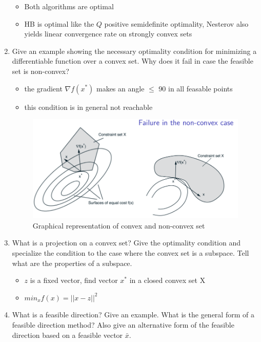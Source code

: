 \documentclass{report}
\newcommand{\question}[1]{{\small\textsf{#1}}}
\begin{document}
\begin{enumerate}
\begin{itemize}
  \item Both algorithms are optimal
  \item HB is optimal like the $Q$ positive semidefinite optimality, Nesterov also yields linear convergence rate on strongly convex sets
  \end{itemize}
\item \question{Give an example showing the necessary optimality condition for minimizing a
    differentiable function over a convex set. Why does it fail in case the feasible set is
    non-convex?}
  \begin{itemize}
  \item the gradient $\nabla f(x^*)$ makes an angle $\leq$ 90 in all feasable points
  \item this condition is in general not reachable

\end{itemize}
\begin{figure}[H]
\includegraphics[width=\textwidth]{non_convex.png}
\caption{Graphical representation of convex and non-convex set \label{fig:convex}}
\end{figure}
\item \question{What is a projection on a convex set? Give the optimality condition and specialize
    the condition to the case where the convex set is a subspace.  Tell what are the properties of a
    subspace.}
  \begin{itemize}
  \item $z$ is a fixed vector, find vector $x^*$ in a closed convex set X
  \item $min_x f(x) = || x - z || ^2$
  \end{itemize}
\item \question{What is a feasible direction? Give an example. What is the general form of a
    feasible direction method? Also give an alternative form of the feasible direction based on a
    feasible vector \(\bar{x}\).}


\end{enumerate}
\end{document}
